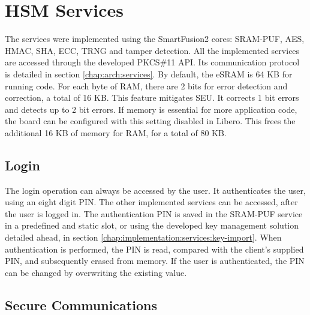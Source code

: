 
\section{HSM Services}\label{chap:implementation:services}

The services were implemented using the SmartFusion2 cores: SRAM-PUF, AES, HMAC, SHA, ECC, TRNG and tamper detection.
All the implemented services are accessed through the developed PKCS\#11 API. Its communication protocol is detailed in section \ref{chap:arch:services}.
By default, the eSRAM is 64 KB for running code. For each byte of RAM, there are 2 bits for error detection and correction, a total of 16 KB. This feature mitigates \ac{SEU}. It corrects 1 bit errors and detects up to 2 bit errors. If memory is essential for more application code, the board can be configured with this setting disabled in Libero. This frees the additional 16 KB of memory for RAM, for a total of 80 KB.

\subsection{Login}\label{chap:implementation:services:authentication}

The login operation can always be accessed by the user. It authenticates the user, using an eight digit PIN. The other implemented services can be accessed, after the user is logged in.
The authentication PIN is saved in the SRAM-PUF service in a predefined and static slot, or using the developed key management solution detailed ahead, in section \ref{chap:implementation:services:key-import}. When authentication is performed, the PIN is read, compared with the client's supplied PIN, and subsequently erased from memory.
If the user is authenticated, the PIN can be changed by overwriting the existing value.

\subsection{Secure Communications}\label{chap:implementation:services:secure}

